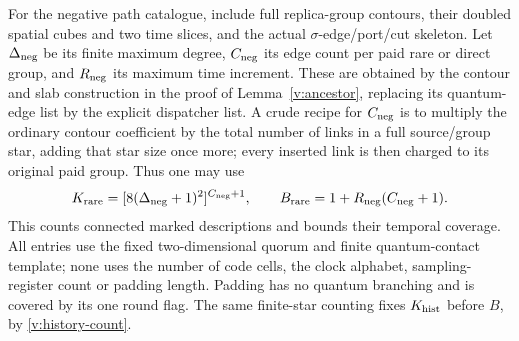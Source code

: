 For the negative path catalogue, include full replica-group contours,
their doubled spatial cubes and two time slices, and the actual
\(\sigma\)-edge/port/cut skeleton. Let \(\Delta_{\rm neg}\) be its
finite maximum degree, \(C_{\rm neg}\) its edge count per paid rare
or direct group, and \(R_{\rm neg}\) its maximum time increment.
These are obtained by the contour and slab construction in the proof
of Lemma~\ref{v:ancestor}, replacing its quantum-edge list by the
explicit dispatcher list. A crude recipe for \(C_{\rm neg}\) is to
multiply the ordinary contour coefficient by the total number of links
in a full source/group star, adding that star size once more; every
inserted link is then charged to its original paid group. Thus one may
use
\[
 K_{\rm rare}=[8(\Delta_{\rm neg}+1)^2]^{C_{\rm neg}+1},\qquad
 B_{\rm rare}=1+R_{\rm neg}(C_{\rm neg}+1).
\]
This counts connected marked descriptions and bounds their temporal
coverage. All entries use the fixed two-dimensional quorum and finite
quantum-contact template; none uses the number of code cells, the
clock alphabet, sampling-register count or padding length. Padding has no
quantum branching and is covered by its one round flag. The same
finite-star counting fixes \(K_{\rm hist}\) before \(B\), by
\eqref{v:history-count}.


